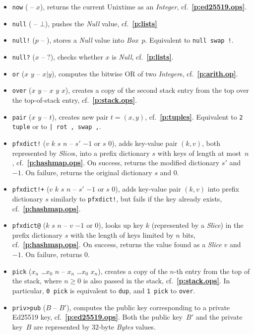 \documentclass[12pt,oneside]{article}
\def\refpoint#1{{\rm\textbf{\ref{#1}}}}
\let\ptref=\refpoint
\begin{document}
\begin{itemize}
\item {\tt now} ( -- $x$), returns the current Unixtime as an {\em Integer}, cf.~\ptref{p:ed25519.ops}.
\item {\tt null} ( -- $\bot$), pushes the {\em Null\/} value, cf.~\ptref{p:lists}
\item {\tt null!} ($p$ -- ), stores a {\em Null\/} value into {\em Box\/}~$p$. Equivalent to {\tt null swap !}.
\item {\tt null?} ($x$ -- $?$), checks whether $x$ is {\em Null}, cf.~\ptref{p:lists}.
\item {\tt or} ($x$ $y$ -- $x|y$), computes the bitwise OR of two {\em Integer\/}s, cf.~\ptref{p:arith.op}.
\item {\tt over} ($x$ $y$ -- $x$ $y$ $x$), creates a copy of the second stack entry from the top over the top-of-stack entry, cf.~\ptref{p:stack.ops}.
\item {\tt pair} ($x$ $y$ -- $t$), creates new pair $t=(x,y)$, cf.~\ptref{p:tuples}. Equivalent to {\tt 2 tuple} or to {\tt | rot , swap ,}.
\item {\tt pfxdict!} ($v$ $k$ $s$ $n$ -- $s'$ $-1$ or $s$ $0$), adds key-value pair $(k,v)$, both represented by {\em Slice\/}s, into a prefix dictionary $s$ with keys of length at most~$n$, cf.~\ptref{p:hashmap.ops}. On success, returns the modified dictionary $s'$ and $-1$. On failure, returns the original dictionary $s$ and $0$.
\item {\tt pfxdict!+} ($v$ $k$ $s$ $n$ -- $s'$ $-1$ or $s$ $0$), adds key-value pair $(k,v)$ into prefix dictionary $s$ similarly to {\tt pfxdict!}, but fails if the key already exists, cf.~\ptref{p:hashmap.ops}.
\item {\tt pfxdict@} ($k$ $s$ $n$ -- $v$ $-1$ or $0$), looks up key $k$ (represented by a {\em Slice\/}) in the prefix dictionary $s$ with the length of keys limited by $n$ bits, cf.~\ptref{p:hashmap.ops}. On success, returns the value found as a {\em Slice\/} $v$ and $-1$. On failure, returns $0$.
\item {\tt pick} ($x_n$ \dots $x_0$ $n$ -- $x_n$ \dots $x_0$ $x_n$), creates a copy of the $n$-th entry from the top of the stack, where $n\geq0$ is also passed in the stack, cf.~\ptref{p:stack.ops}. In particular, {\tt 0 pick} is equivalent to {\tt dup}, and {\tt 1 pick} to {\tt over}.
\item {\tt priv>pub} ($B$ -- $B'$), computes the public key corresponding to a private Ed25519 key, cf.~\ptref{p:ed25519.ops}. Both the public key~$B'$ and the private key~$B$ are represented by 32-byte {\em Bytes\/} values.

\end{itemize}
\end{document}

